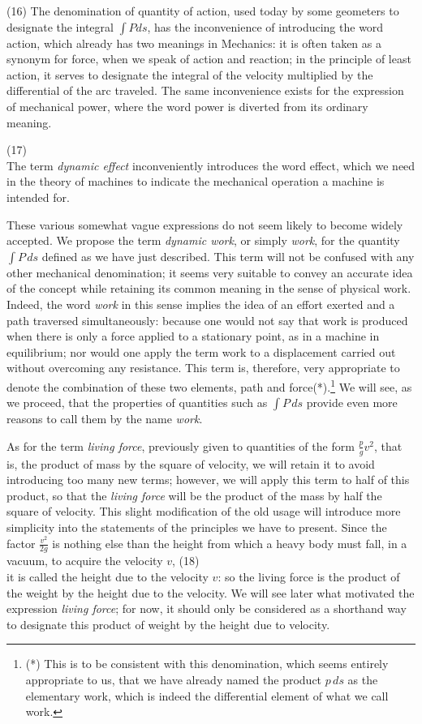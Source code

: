 \documentclass{book}
\begin{document}
(16) The denomination of quantity of action, used today by some geometers to designate the integral \(\int Pds\), has the inconvenience of introducing the word action, which already has two meanings in Mechanics: it is often taken as a synonym for force, when we speak of action and reaction; in the principle of least action, it serves to designate the integral of the velocity multiplied by the differential of the arc traveled.
The same inconvenience exists for the expression of mechanical power, where the word power is diverted from its ordinary meaning.

\newpage
(17)\\
The term \textit{dynamic effect} inconveniently introduces the word effect, which we need in the theory of machines to indicate the mechanical operation a machine is intended for.

These various somewhat vague expressions do not seem likely to become widely accepted. We propose the term \textit{dynamic work}, or simply \textit{work}, for the quantity \(\int P \, ds\) defined as we have just described. This term will not be confused with any other mechanical denomination; it seems very suitable to convey an accurate idea of the concept while retaining its common meaning in the sense of physical work. Indeed, the word \textit{work} in this sense implies the idea of an effort exerted and a path traversed simultaneously: because one would not say that work is produced when there is only a force applied to a stationary point, as in a machine in equilibrium; nor would one apply the term work to a displacement carried out without overcoming any resistance. This term is, therefore, very appropriate to denote the combination of these two elements, path and force(*).\footnote{(*) This is to be consistent with this denomination, which seems entirely appropriate to us, that we have already named the product \(p \, ds\) as the elementary work, which is indeed the differential element of what we call work.
} We will see, as we proceed, that the properties of quantities such as \(\int P \, ds\) provide even more reasons to call them by the name \textit{work}.

As for the term \textit{living force}, previously given to quantities of the form \(\frac{p}{g} v^2\), that is, the product of mass by the square of velocity, we will retain it to avoid introducing too many new terms; however, we will apply this term to half of this product, so that the \textit{living force} will be the product of the mass by half the square of velocity. This slight modification of the old usage will introduce more simplicity into the statements of the principles we have to present. Since the factor \(\frac{v^2}{2g}\) is nothing else than the height from which a heavy body must fall, in a vacuum, to acquire the velocity \(v\), 
\newpage
(18)\\
it is called the height due to the velocity \(v\): so the living force is the product of the weight by the height due to the velocity. We will see later what motivated the expression \textit{living force}; for now, it should only be considered as a shorthand way to designate this product of weight by the height due to velocity.
\end{document}
